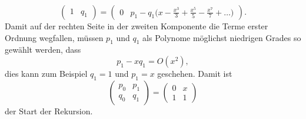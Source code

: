 \begin{refsection}
\[\begin{pmatrix}
1&q_1
\end{pmatrix}
=
\begin{pmatrix}
0
&
p_1 - q_1
\biggl(\displaystyle x-\frac{x^3}{3}+\frac{x^5}{5}-\frac{x^7}{7}+\dots\biggr)
\end{pmatrix}.
\]
Damit auf der rechten Seite in der zweiten Komponente die Terme erster Ordnung
wegfallen, müssen $p_1$ und $q_1$ als Polynome möglichst niedrigen Grades
so gewählt werden, dass
\[
p_1-xq_1 = O(x^2),
\]
dies kann zum Beispiel $q_1=1$ und $p_1=x$ geschehen.
Damit ist
\[
\begin{pmatrix}
p_0&p_1\\
q_0&q_1
\end{pmatrix}
=
\begin{pmatrix}
0&x\\
1&1
\end{pmatrix}
\]
der Start der Rekursion.


\end{refsection}
